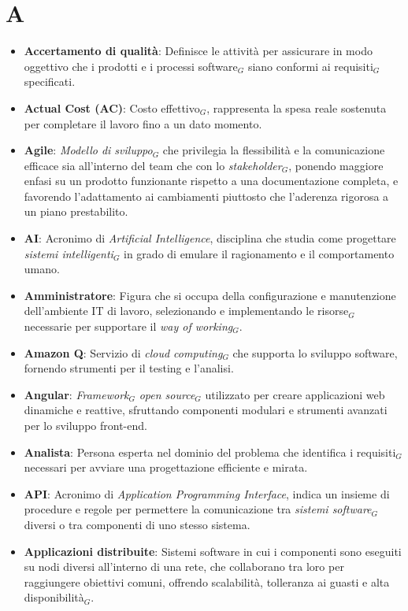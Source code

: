 \section{A}
\begin{itemize}
    \item \textbf{Accertamento di qualità}: Definisce le attività per assicurare in modo oggettivo che i prodotti e i processi software$_G$ siano conformi ai requisiti$_G$ specificati.
    \item \textbf{Actual Cost (AC)}: Costo effettivo$_G$, rappresenta la spesa reale sostenuta per completare il lavoro fino a un dato momento.
    \item \textbf{Agile}: \textit{Modello di sviluppo}$_G$ che privilegia la flessibilità e la comunicazione efficace sia all'interno del team che con lo \textit{stakeholder}$_G$, ponendo maggiore enfasi su un prodotto funzionante rispetto a una documentazione completa, e favorendo l'adattamento ai cambiamenti piuttosto che l'aderenza rigorosa a un piano prestabilito.
    \item \textbf{AI}: Acronimo di \textit{Artificial Intelligence}, disciplina che studia come progettare \textit{sistemi intelligenti}$_G$ in grado di emulare il ragionamento e il comportamento umano.
    \item \textbf{Amministratore}: Figura che si occupa della configurazione e manutenzione dell'ambiente IT di lavoro, selezionando e implementando le risorse$_G$ necessarie per supportare il \textit{way of working}$_G$.
    \item \textbf{Amazon Q}: Servizio di \textit{cloud computing}$_G$ che supporta lo sviluppo software, fornendo strumenti per il testing e l’analisi.
    \item \textbf{Angular}: \textit{Framework}$_G$ \textit{open source}$_G$ utilizzato per creare applicazioni web dinamiche e reattive, sfruttando componenti modulari e strumenti avanzati per lo sviluppo front-end.
    \item \textbf{Analista}: Persona esperta nel dominio del problema che identifica i requisiti$_G$ necessari per avviare una progettazione efficiente e mirata.
    \item \textbf{API}: Acronimo di \textit{Application Programming Interface}, indica un insieme di procedure e regole per permettere la comunicazione tra \textit{sistemi software}$_G$ diversi o tra componenti di uno stesso sistema.
    \item \textbf{Applicazioni distribuite}: Sistemi software in cui i componenti sono eseguiti su nodi diversi all'interno di una rete, che collaborano tra loro per raggiungere obiettivi comuni, offrendo scalabilità, tolleranza ai guasti e alta disponibilità$_G$.

\end{itemize}
